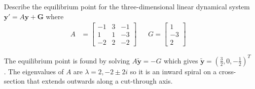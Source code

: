 \begin{Exercise}
Describe the equilibrium point for the three-dimensional linear dynamical system $\textbf{y}' = A\textbf{y} + \textbf{G}$ where
\begin{align*}
A &= 
\begin{bmatrix}
-1&3&-1\\ 
1&1&-3\\ 
-2&2&-2
\end{bmatrix}
& & G=
\begin{bmatrix}
1 \\
-3 \\
2
\end{bmatrix}
\end{align*}
\end{Exercise}
\begin{Answer}
The equilibrium point is found by solving $A\tilde{\textbf{y}} = -G$ which gives $\tilde{\textbf{y}} = (\frac{3}{2}, 0, -\frac{1}{2})^T$. The eigenvalues of $A$ are $\lambda = 2, -2\pm 2i$ so it is an inward spiral on a cross-section that extends outwards along a cut-through axis.
\end{Answer}

